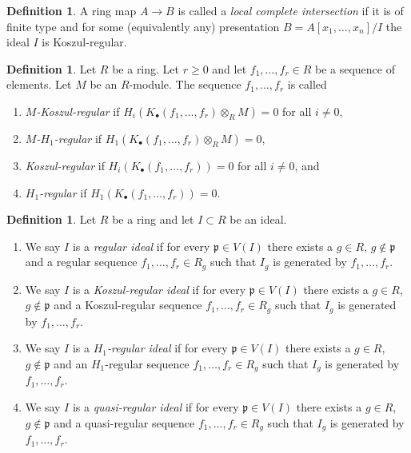 \documentclass{amsart}
\theoremstyle{plain}
\theoremstyle{definition}
\newtheorem{definition}[subsection]{Definition}
\theoremstyle{remark}
\numberwithin{equation}{subsection}
\begin{document}
\begin{definition}
\label{definition-local-complete-intersection}
A ring map $A \to B$ is called a {\it local complete intersection}
if it is of finite type and for some (equivalently any) presentation
$B = A[x_1, \ldots, x_n]/I$ the ideal $I$ is Koszul-regular.
\end{definition}

\begin{definition}
\label{definition-koszul-regular-sequence}
Let $R$ be a ring. Let $r \geq 0$ and let $f_1, \ldots, f_r \in R$
be a sequence of elements. Let $M$ be an $R$-module.
The sequence $f_1, \ldots, f_r$ is called
\begin{enumerate}
\item {\it $M$-Koszul-regular} if
$H_i(K_\bullet(f_1, \ldots, f_r) \otimes_R M) = 0$ for
all $i \not = 0$,
\item {\it $M$-$H_1$-regular} if
$H_1(K_\bullet(f_1, \ldots, f_r) \otimes_R M) = 0$,
\item {\it Koszul-regular} if $H_i(K_\bullet(f_1, \ldots, f_r)) = 0$ for
all $i \not = 0$, and
\item {\it $H_1$-regular} if $H_1(K_\bullet(f_1, \ldots, f_r)) = 0$.
\end{enumerate}
\end{definition}

\begin{definition}
\label{definition-regular-ideal}
Let $R$ be a ring and let $I \subset R$ be an ideal.
\begin{enumerate}
\item We say $I$ is a {\it regular ideal} if for every
$\mathfrak p \in V(I)$ there exists a $g \in R$, $g \not \in \mathfrak p$
and a regular sequence $f_1, \ldots, f_r \in R_g$ such that $I_g$
is generated by $f_1, \ldots, f_r$.
\item We say $I$ is a {\it Koszul-regular ideal} if for every
$\mathfrak p \in V(I)$ there exists a $g \in R$, $g \not \in \mathfrak p$
and a Koszul-regular sequence $f_1, \ldots, f_r \in R_g$ such that $I_g$
is generated by $f_1, \ldots, f_r$.
\item We say $I$ is a {\it $H_1$-regular ideal} if for every
$\mathfrak p \in V(I)$ there exists a $g \in R$, $g \not \in \mathfrak p$
and an $H_1$-regular sequence $f_1, \ldots, f_r \in R_g$ such that $I_g$
is generated by $f_1, \ldots, f_r$.
\item We say $I$ is a {\it quasi-regular ideal} if for every
$\mathfrak p \in V(I)$ there exists a $g \in R$, $g \not \in \mathfrak p$
and a quasi-regular sequence $f_1, \ldots, f_r \in R_g$ such that $I_g$
is generated by $f_1, \ldots, f_r$.
\end{enumerate}
\end{definition}
\end{document}

